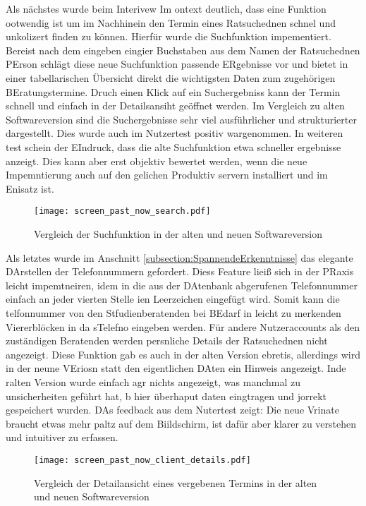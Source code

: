 Als nächstes wurde beim Interivew Im ontext deutlich, dass eine Funktion
ootwendig ist um im Nachhinein den Termin eines Ratsuchednen schnel und
unkolizert finden zu können. Hierfür wurde die Suchfunktion impementiert.
Bereist nach dem eingeben eingier Buchstaben aus dem Namen der Ratsuchednen
PErson schlägt diese neue Suchfunktion passende ERgebnisse vor und bietet in
einer tabellarischen Übersicht direkt die wichtigsten Daten zum zugehörigen
BEratungstermine. Druch einen Klick auf ein Suchergebniss kann der Termin
schnell und einfach in der Detailsansiht geöffnet werden. Im Vergleich zu alten
Softwareversion sind die Suchergebnisse sehr viel ausführlicher und
strukturierter dargestellt. Dies wurde auch im Nutzertest positiv wargenommen.
In weiteren test schein der EIndruck, dass die alte Suchfunktion etwa schneller
ergebnisse anzeigt. Dies kann aber erst objektiv bewertet werden, wenn die neue
Impemntierung auch auf den gelichen Produktiv servern installiert und im
Enisatz ist.

\begin{figure}[H]
    \caption{Vergleich der Suchfunktion in der alten und neuen Softwareversion}
    \centering
    \texttt{[image: screen\_past\_now\_search.pdf]}
\end{figure}

Als letztes wurde im Anschnitt \ref{subsection:SpannendeErkenntnisse} das
elegante DArstellen der Telefonnummern gefordert. Diess Feature lieiß sich in
der PRaxis leicht impemtneiren, idem in die aus der DAtenbank abgerufenen
Telefonnummer einfach an jeder vierten Stelle ien Leerzeichen eingefügt wird.
Somit kann die telfonnummer von den Stfudienberatenden bei BEdarf in leicht zu
merkenden Viererblöcken in da sTelefno eingeben werden. Für andere
Nutzeraccounts als den zuständigen Beratenden werden persnliche Details der
Ratsuchednen nicht angezeigt. Diese Funktion gab es auch in der alten Version
ebretis, allerdings wird in der neune VEriosn statt den eigentlichen DAten ein
Hinweis angezeigt. Inde ralten Version wurde einfach agr nichts angezeigt, was
manchmal zu unsicherheiten geführt hat, b hier überhaput daten eingtragen und
jorrekt gespeichert wurden. DAs feedback aus dem Nutertest zeigt: Die neue
Vrinate braucht etwas mehr paltz auf dem Biildschirm, ist dafür aber klarer zu
verstehen und intuitiver zu erfassen. 

\begin{figure}[H]
    \caption{Vergleich der Detailansicht eines vergebenen Termins in der alten und neuen Softwareversion}
    \centering
    \texttt{[image: screen\_past\_now\_client\_details.pdf]}
\end{figure}

